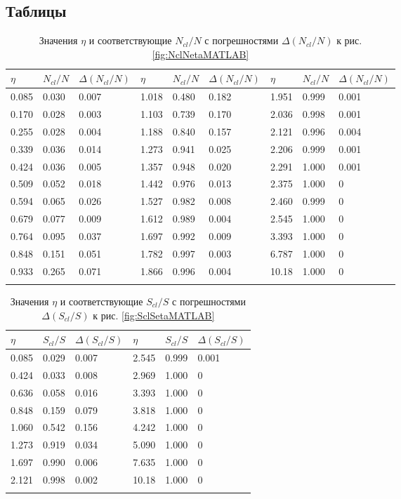 \subsection{Таблицы}
{\footnotesize
\begin{longtable}{| l | l | l || l | l | l || l | l | l |}
	\hline
	$\eta$	&	$N_{cl}/N$	&	$\Delta (N_{cl}/N)$	&	$\eta$	&	$N_{cl}/N$	&	$\Delta (N_{cl}/N)$	&	$\eta$	&	$N_{cl}/N$	&	$\Delta (N_{cl}/N)$	\\
	\hline
	0.085	&	0.030	&	0.007	&	1.018	&	0.480	&	0.182	&	1.951	&	0.999	&	0.001	\\
	0.170	&	0.028	&	0.003	&	1.103	&	0.739	&	0.170	&	2.036	&	0.998	&	0.001	\\
	0.255	&	0.028	&	0.004	&	1.188	&	0.840	&	0.157	&	2.121	&	0.996	&	0.004	\\
	0.339	&	0.036	&	0.014	&	1.273	&	0.941	&	0.025	&	2.206	&	0.999	&	0.001	\\
	0.424	&	0.036	&	0.005	&	1.357	&	0.948	&	0.020	&	2.291	&	1.000	&	0.001	\\
	0.509	&	0.052	&	0.018	&	1.442	&	0.976	&	0.013	&	2.375	&	1.000	&	0	\\
	0.594	&	0.065	&	0.026	&	1.527	&	0.982	&	0.008	&	2.460	&	0.999	&	0	\\
	0.679	&	0.077	&	0.009	&	1.612	&	0.989	&	0.004	&	2.545	&	1.000	&	0	\\
	0.764	&	0.095	&	0.037	&	1.697	&	0.992	&	0.009	&	3.393	&	1.000	&	0	\\
	0.848	&	0.151	&	0.051	&	1.782	&	0.997	&	0.003	&	6.787	&	1.000	&	0	\\
	0.933	&	0.265	&	0.071	&	1.866	&	0.996	&	0.004	&	10.18	&	1.000	&	0	\\
	\hline
	\caption{Значения $\eta$ и соответствующие $N_{cl}/N$ с погрешностями $\Delta (N_{cl}/N)$ к рис. \ref{fig:NclNetaMATLAB}} \label{tab:NclNetaMATLAB}
\end{longtable}}

{\footnotesize
\begin{longtable}{| l | l | l || l | l | l |}
	\hline
	$\eta$	&	$S_{cl}/S$	&	$\Delta (S_{cl}/S)$	&	$\eta$	&	$S_{cl}/S$	&	$\Delta (S_{cl}/S)$	\\
	\hline
	0.085	&	0.029	&	0.007	&	2.545	&	0.999	&	0.001	\\
	0.424	&	0.033	&	0.008	&	2.969	&	1.000	&	0	\\
	0.636	&	0.058	&	0.016	&	3.393	&	1.000	&	0	\\
	0.848	&	0.159	&	0.079	&	3.818	&	1.000	&	0	\\
	1.060	&	0.542	&	0.156	&	4.242	&	1.000	&	0	\\
	1.273	&	0.919	&	0.034	&	5.090	&	1.000	&	0	\\
	1.697	&	0.990	&	0.006	&	7.635	&	1.000	&	0	\\
	2.121	&	0.998	&	0.002	&	10.18	&	1.000	&	0	\\
	\hline
	\caption{Значения $\eta$ и соответствующие $S_{cl}/S$ с погрешностями $\Delta (S_{cl}/S)$ к рис. \ref{fig:SclSetaMATLAB}} \label{tab:SclSetaMATLAB}
\end{longtable}}

